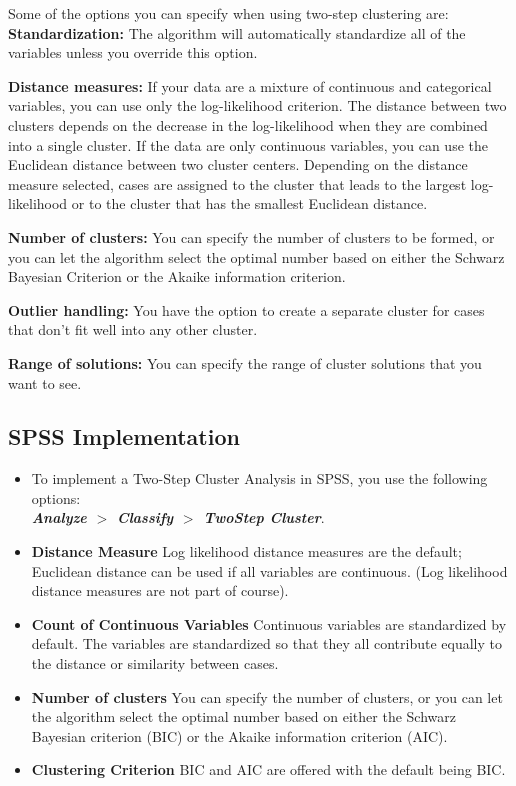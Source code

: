 \documentclass[a4paper,12pt]{report}
\begin{document}
Some of the options you can specify when using two-step clustering are:
\textbf{Standardization:} The algorithm will automatically standardize all of the variables
unless you override this option.

\textbf{Distance measures:} If your data are a mixture of continuous and categorical variables,
you can use only the log-likelihood criterion. The distance between two clusters
depends on the decrease in the log-likelihood when they are combined into a single
cluster. If the data are only continuous variables, you can use the Euclidean
distance between two cluster centers. Depending on the distance measure selected,
cases are assigned to the cluster that leads to the largest log-likelihood or to the cluster
that has the smallest Euclidean distance.


\textbf{Number of clusters:} You can specify the number of clusters to be formed, or you can let
the algorithm select the optimal number based on either the Schwarz Bayesian
Criterion or the Akaike information criterion.


\textbf{Outlier handling:} You have the option to create a separate cluster for cases that don't fit
well into any other cluster.


\textbf{Range of solutions:} You can specify the range of cluster solutions that you want to see.

\subsection{SPSS Implementation}

\begin{itemize}
	\item To implement a Two-Step Cluster Analysis in SPSS, you use the following options:\\
	\textbf{\textit{Analyze $>$ Classify $>$ TwoStep Cluster}}.
	
	\item \textbf{Distance Measure} Log likelihood distance measures are the default; Euclidean distance can be used if all variables are continuous. (Log likelihood distance measures are not part of course).
	
	\item \textbf{Count of Continuous Variables} Continuous variables are standardized by default. The variables
	are standardized so that they all contribute equally to the distance or similarity between cases.
	
	\item \textbf{Number of clusters} You can specify the number of clusters, or you can let the algorithm select
	the optimal number based on either the Schwarz Bayesian criterion (BIC) or the Akaike
	information criterion (AIC).
	
	\item \textbf{Clustering Criterion} BIC and AIC are offered with the default being BIC.
\end{itemize}
\end{document}
